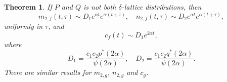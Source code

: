 \documentclass[12pt]{amsart}
\theoremstyle{plain}
\newtheorem{thm}{Theorem}[section]
\theoremstyle{definition}
\theoremstyle{remark}
\theoremstyle{definition}
\begin{document}
\begin{thm}\label{m2fn2fsim}
If $P$ and $Q$ is not both $\delta$-lattice distributions, then
\begin{equation}
m_{2,f}(t,\tau) \sim D_1 e^{\alpha t} e^{\alpha (t+\tau)}, \quad
n_{2,f}(t,\tau) \sim D_2 e^{\alpha t} e^{\alpha (t+\tau)},
\end{equation}
uniformly in $\tau$, and
\begin{equation}
c_{f}(t) \sim D_1 e^{2\alpha t},
\end{equation}
where
\begin{equation}
D_1 = \frac{c_1c_2 p^*(2\alpha)}{\psi(2\alpha)} , \quad
D_2 = \frac{c_1c_2 q^*(2\alpha)}{\psi(2\alpha)} .
\end{equation}
There are similar results for $m_{2,g}$, $n_{2,g}$ and $c_g$.
\end{thm}
\end{document}

